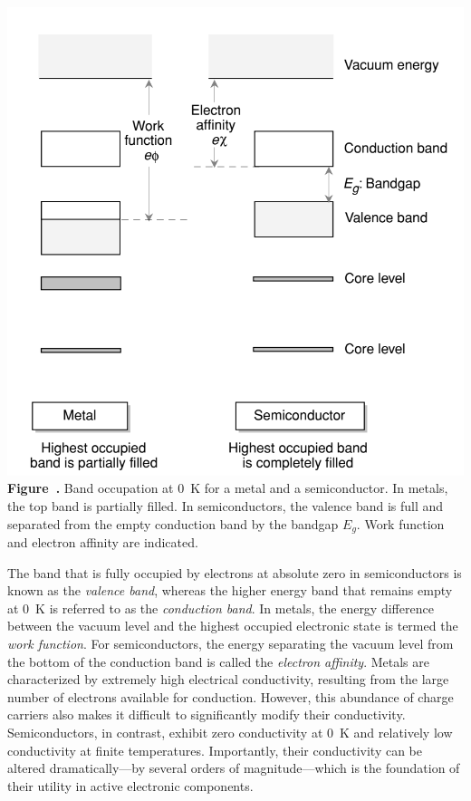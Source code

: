 \begin{center}
	\begin{minipage}{0.6\textwidth}
		\centering
		\includegraphics[width=\textwidth]{img/metalsVSsemiconductors.png}
		\\[0.5em]
		\textbf{Figure~\thefigure.} Band occupation at 0~K for a metal and a semiconductor. In metals, the top band is partially filled. In semiconductors, the valence band is full and separated from the empty conduction band by the bandgap \( E_g \). Work function and electron affinity are indicated.
		\label{fig:metalsVSsemiconductors}
	\end{minipage}
\end{center}
The band that is fully occupied by electrons at absolute zero in semiconductors is known as the \textit{valence band}, whereas the higher energy band that remains empty at 0~K is referred to as the \textit{conduction band}. In metals, the energy difference between the vacuum level and the highest occupied electronic state is termed the \textit{work function}. For semiconductors, the energy separating the vacuum level from the bottom of the conduction band is called the \textit{electron affinity}.
Metals are characterized by extremely high electrical conductivity, resulting from the large number of electrons available for conduction. However, this abundance of charge carriers also makes it difficult to significantly modify their conductivity. Semiconductors, in contrast, exhibit zero conductivity at 0~K and relatively low conductivity at finite temperatures. Importantly, their conductivity can be altered dramatically—by several orders of magnitude—which is the foundation of their utility in active electronic components.
